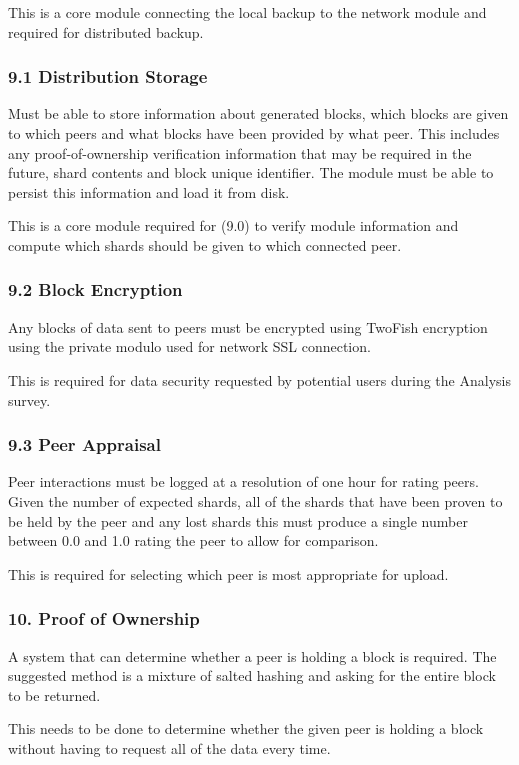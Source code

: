 \documentclass[a4paper, 11pt, twocolumn, twoside]{report}
\begin{document}
This is a core module connecting the local backup to the network module and required for distributed backup.

\subsubsection{9.1 Distribution Storage}
Must be able to store information about generated blocks, which blocks are given to which peers and what blocks have been provided by what peer. This includes any proof-of-ownership verification information that may be required in the future, shard contents and block unique identifier. The module must be able to persist this information and load it from disk.

This is a core module required for (9.0) to verify module information and compute which shards should be given to which connected peer.

\subsubsection{9.2 Block Encryption}
Any blocks of data sent to peers must be encrypted using TwoFish encryption using the private modulo used for network SSL connection.

This is required for data security requested by potential users during the Analysis survey.

\subsubsection{9.3 Peer Appraisal}

Peer interactions must be logged at a resolution of one hour for rating peers. Given the number of expected shards, all of the shards that have been proven to be held by the peer and any lost shards this must produce a single number between 0.0 and 1.0 rating the peer to allow for comparison.

This is required for selecting which peer is most appropriate for upload.

\subsubsection{10. Proof of Ownership}

A system that can determine whether a peer is holding a block is required. The suggested method is a mixture of salted hashing and asking for the entire block to be returned. 

This needs to be done to determine whether the given peer is holding a block without having to request all of the data every time.
\end{document}
